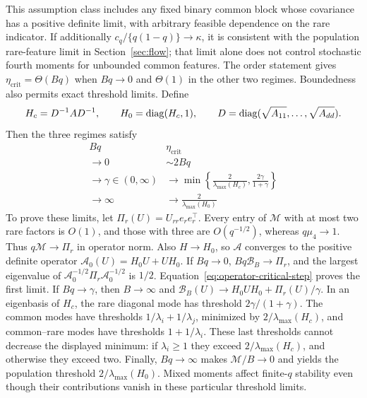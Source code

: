 This assumption class includes any fixed binary common block whose covariance
has a positive definite limit, with arbitrary feasible dependence on the rare
indicator. If additionally $c_q/\{q(1 - q)\} \to \kappa$, it is consistent with
the population rare-feature limit in Section~\ref{sec:flow}; that limit alone
does not control stochastic fourth moments for unbounded common features. The
order statement gives $\eta_{\mathrm{crit}} = \Theta(Bq)$ when $Bq \to 0$ and
$\Theta(1)$ in the other two regimes. Boundedness also permits exact threshold
limits. Define
\[
 H_c = D^{-1}AD^{-1},\qquad H_0
     = \operatorname{diag}(H_c,1),\qquad D
     = \operatorname{diag}(\sqrt{A_{11}},\ldots,\sqrt{A_{dd}}).
\]
Then the three regimes satisfy
\begin{equation}
 \label{eq:block-threshold-limits}
 \begin{array}{c|c}
             Bq             &                                             \eta_{\mathrm{crit}}                                             \\
  \hline
            \to 0           &                                                   \sim 2Bq                                                   \\
  \to \gamma \in (0,\infty) & \displaystyle \longrightarrow \min\left\{ \frac{2}{\lambda_{\max}(H_c)}, \frac{2\gamma}{1 + \gamma} \right\} \\
         \to \infty         &                         \displaystyle \longrightarrow \frac{2}{\lambda_{\max}(H_0)}
 \end{array}
\end{equation}
To prove these limits, let $\Pi_r(U) = U_{rr}e_re_r^\top$. Every entry of
$\mathcal M$ with at most two rare factors is $O(1)$, and those with three are
$O(q^{-1/2})$, whereas $q\mu_4 \to 1$. Thus $q\mathcal M \to \Pi_r$ in operator
norm. Also $H \to H_0$, so $\mathcal A$ converges to the positive definite
operator $\mathcal A_0(U) = H_0U + UH_0$. If $Bq \to 0$,
$Bq\mathcal B_B \to \Pi_r$, and the largest eigenvalue of
$\mathcal A_0^{-1/2}\Pi_r\mathcal A_0^{-1/2}$ is $1/2$.
Equation~\eqref{eq:operator-critical-step} proves the first limit. If
$Bq \to \gamma$, then $B \to \infty$ and
$\mathcal B_B(U) \to H_0UH_0 + \Pi_r(U)/\gamma$. In an eigenbasis of $H_c$, the
rare diagonal mode has threshold $2\gamma/(1 + \gamma)$. The common modes have
thresholds $1/\lambda_i + 1/\lambda_j$, minimized by $2/\lambda_{\max}(H_c)$,
and common--rare modes have thresholds $1 + 1/\lambda_i$. These last thresholds
cannot decrease the displayed minimum: if $\lambda_i \ge 1$ they exceed
$2/\lambda_{\max}(H_c)$, and otherwise they exceed two. Finally, $Bq \to \infty$
makes $\mathcal M/B \to 0$ and yields the population threshold
$2/\lambda_{\max}(H_0)$. Mixed moments affect finite-$q$ stability even though
their contributions vanish in these particular threshold limits.


